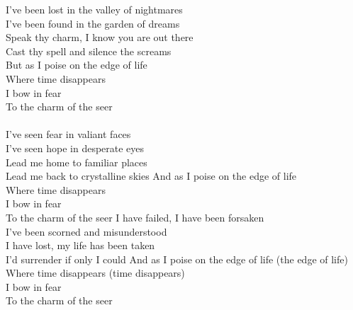 I've been lost in the valley of nightmares\\
I've been found in the garden of dreams\\
Speak thy charm, I know you are out there\\
Cast thy spell and silence the screams\\
\hops
{} But as I poise on the edge of life\\
 Where time disappears\tab{}\\
 I bow in fear\tab{}\\
 To the charm of the seer \tab{}\\
\tab{}\tab{}\\
\tab{}\tab{}
\hops
I've seen fear in valiant faces\\
I've seen hope in desperate eyes\\
Lead me home to familiar places\\
Lead me back to crystalline skies
\hops
{} And as I poise on the edge of life\\
 Where time disappears\\
 I bow in fear\\
 To the charm of the seer
\hops
I have failed, I have been forsaken\\
I've been scorned and misunderstood\\
I have lost, my life has been taken\\
I'd surrender if only I could
\hops
{} And as I poise on the edge of life (the edge of life)\\
 Where time disappears (time disappears)\\
 I bow in fear\\
 To the charm of the seer